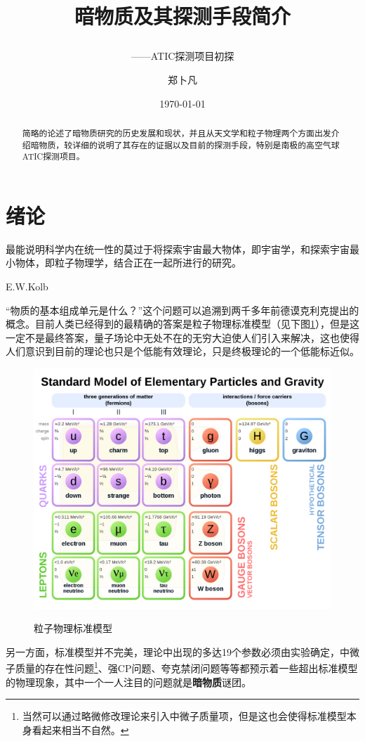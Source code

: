 \documentclass{ctexart}
\title{暗物质及其探测手段简介\\ \subtitle{——ATIC探测项目初探}  } %
\author{郑卜凡\quad2021302022016}                     %
\date{\today}                             %
\newcommand{\dotemph}[1]{\CJKunderdot{#1}}
\begin{document}
    \maketitle              %
    \begin{abstract}
        简略的论述了暗物质研究的历史发展和现状，并且从天文学和粒子物理两个方面出发介绍暗物质，较详细的说明了其存在的证据以及目前的探测手段，特别是南极的高空气球ATIC探测项目。
    \end{abstract}
    \tableofcontents        %
	
	\section{绪论}
	\setlength{\epigraphwidth}{.7\textwidth}
	\epigraph{最能说明科学内在统一性的莫过于将探索宇宙最大物体，即宇宙学，和探索宇宙最小物体，即粒子物理学，结合正在一起所进行的研究。}{E.W.Kolb}
	“物质的基本组成单元是什么？”这个问题可以追溯到两千多年前德谟克利克提出\dotemph{原子}的概念。目前人类已经得到的最精确的答案是粒子物理标准模型（见下图\ref{fig:1}），但是这一定不是最终答案，量子场论中无处不在的无穷大迫使人们引入\dotemph{重整化}来解决，这也使得人们意识到目前的理论也只是个低能有效理论，只是终极理论的一个低能标近似。\cite{AZ}
	
	\begin{figure}[h]
		\centering
		\includegraphics[width=0.618\linewidth]{figs/Standard_Model_of_Elementary_Particles.png}
		\label{fig:1}
		\caption{粒子物理标准模型}
	\end{figure}
	
	另一方面，标准模型并不完美，理论中出现的多达19个参数必须由实验确定，中微子质量的存在性问题\footnote{当然可以通过略微修改理论来引入中微子质量项，但是这也会使得标准模型本身看起来相当不自然。\cite{PFS}}、强CP问题、夸克禁闭问题等等都预示着一些超出标准模型的物理现象，其中一个一人注目的问题就是\textbf{暗物质}谜团。
	
\end{document}

